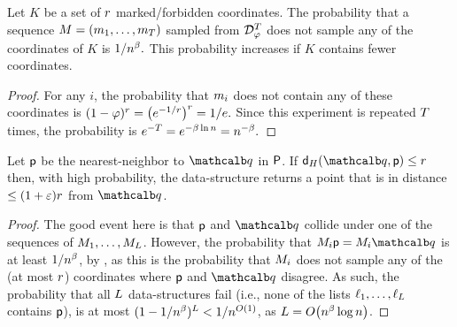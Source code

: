 
\begin{lemma}
    Let $K$ be a set of $r$ marked/forbidden coordinates. The
    probability that a sequence
    ${M} = ({{m}}_1,\ldots, {{m}}_T)$ sampled from
    $\mathcal{D}_{\varphi}^T$ does not sample any of the coordinates of
    $K$ is
    \begin{math}
        1/n^{\beta}.
    \end{math}
    This probability increases if $K$ contains fewer coordinates.
\end{lemma}

\begin{proof}
    For any $i$, the probability that ${{m}}_i$ does not contain any
    of these coordinates is
    \begin{math}
        (1-\pr)^\rad%
        =%
        \bigl(e^{-1/\rad }\bigr)^{\rad}%
        =%
        1/e.
    \end{math}
    Since this experiment is repeated $T$ times, the probability
    is
    \begin{math}
        e^{-\tTimes}%
        =%
        e^{ - \cTimes \ln n}%
        =%
        n^{- \cTimes}.
    \end{math}
    \qquad
\end{proof}


\begin{lemma}
    Let $\mathsf{p}$ be the nearest-neighbor to $\query$ in ${\mathsf{P}}$.  If
    $\distH{\query}{\pnt} \leq \rad$ then, with high probability, the
    data-structure returns a point that is in distance
    $\leq (1+{\varepsilon})r$ from $\query$.
\end{lemma}
\begin{proof}
    The good event here is that $\mathsf{p}$ and $\query$ collide under
    one of the sequences of ${M}_1,\ldots, {M}_L$.  However,
    the probability that $\seq_i \pnt = \seq_i \query$ is at least
    $1/n^{\beta}$, by , as this is the
    probability that ${M}_i$ does not sample any of the (at most
    $r$) coordinates where $\mathsf{p}$ and $\query$ disagree. As such,
    the probability that all $L$ data-structures fail (i.e.,
    none of the lists $\ell_1,\ldots, \ell_L$ contains $\mathsf{p}$),
    is at most $(1- 1/n^{\beta})^{L} < 1/n^{O(1)}$, as
    $\DSTimes = O\pth{ n^{\cTimes} \log n}$.
\end{proof}

